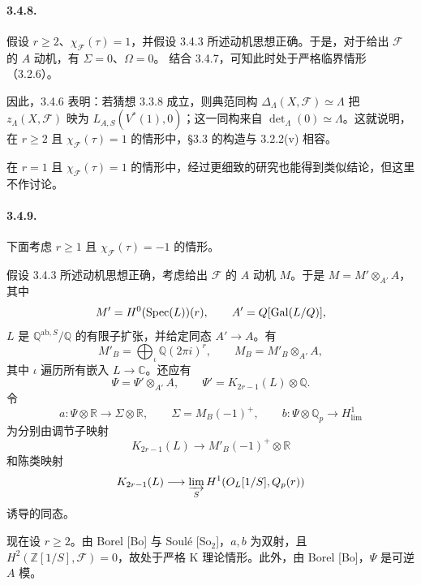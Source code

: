 \paragraph{3.4.8.} 假设 $r\ge2$、$\chi_{\mathcal F}(\tau)=1$，并假设 3.4.3 所述动机思想正确。于是，对于给出 $\mathcal F$ 的 $A$ 动机，有 $\Sigma=0$、$\Omega=0$。
结合 3.4.7，可知此时处于严格临界情形（3.2.6）。

因此，3.4.6 表明：若猜想 3.3.8 成立，则典范同构 $\Delta_\Lambda(X,\mathcal F)\simeq\Lambda$ 把 $z_\Lambda(X,\mathcal F)$ 映为 $L_{A,S}(V^*(1),0)$；这一同构来自 $\det_\Lambda(0)\simeq\Lambda$。这就说明，在 $r\ge2$ 且 $\chi_{\mathcal F}(\tau)=1$ 的情形中，§3.3 的构造与 3.2.2(v) 相容。

在 $r=1$ 且 $\chi_{\mathcal F}(\tau)=1$ 的情形中，经过更细致的研究也能得到类似结论，但这里不作讨论。

\paragraph{3.4.9.} 下面考虑 $r\ge1$ 且 $\chi_{\mathcal F}(\tau)=-1$ 的情形。

假设 3.4.3 所述动机思想正确，考虑给出 $\mathcal F$ 的 $A$ 动机 $M$。于是 $M=M'\otimes_{A'}A$，其中
\[
 M'=H^0(\Spec(L))(r),\qquad A'=\mathbb Q[\Gal(L/\mathbb Q)],
\]
$L$ 是 $\mathbb Q^{\mathrm{ab},S}/\mathbb Q$ 的有限子扩张，并给定同态 $A'\to A$。有
\[
 M'_B=\bigoplus_\iota\mathbb Q(2\pi i)^r,\qquad M_B=M'_B\otimes_{A'}A,
\]
其中 $\iota$ 遍历所有嵌入 $L\to\mathbb C$。还应有
\[
 \Psi=\Psi'\otimes_{A'}A,\qquad\Psi'=K_{2r-1}(L)\otimes\mathbb Q.
\]
令
\[
 a:\Psi\otimes\mathbb R\longrightarrow\Sigma\otimes\mathbb R,
 \qquad\Sigma=M_B(-1)^+,
 \qquad b:\Psi\otimes\mathbb Q_p\longrightarrow H^1_{\mathrm{lim}}
\]
为分别由调节子映射
\[
 K_{2r-1}(L)\longrightarrow M'_B(-1)^+\otimes\mathbb R
\]
和陈类映射
\[
 K_{2r-1}(L)\longrightarrow\varinjlim_S H^1(\mathcal O_L[1/S],\mathbb Q_p(r))
\]
诱导的同态。

现在设 $r\ge2$。由 Borel [Bo] 与 Soulé [So$_2$]，$a,b$ 为双射，且 $H^2(\mathbb Z[1/S],\mathcal F)=0$，故处于严格 K 理论情形。此外，由 Borel [Bo]，$\Psi$ 是可逆 $A$ 模。
